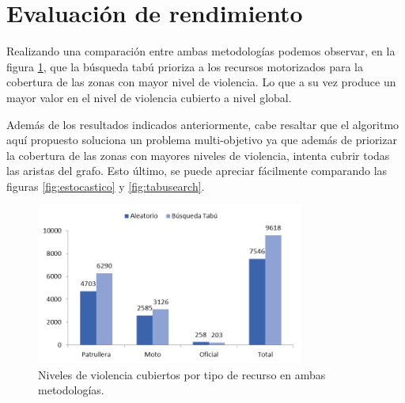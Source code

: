\section{Evaluación de rendimiento}
Realizando una comparación entre ambas metodologías podemos observar, en la figura \ref{fig:comparativa}, que la búsqueda tabú prioriza a los recursos motorizados para la cobertura de las zonas con mayor nivel de violencia. Lo que a su vez produce un mayor valor en el nivel de violencia cubierto a nivel global.

Además de los resultados indicados anteriormente, cabe resaltar que el algoritmo aquí propuesto soluciona un problema multi-objetivo ya que además de priorizar la cobertura de las zonas con mayores niveles de violencia, intenta cubrir todas las aristas del grafo. Esto último, se puede apreciar fácilmente comparando las figuras \ref{fig:estocastico} y \ref{fig:tabusearch}.
\begin{figure}
    \centering
    \includegraphics[width=88mm,scale=0.5]{images/comparativa.png}
    \caption{Niveles de violencia cubiertos por tipo de recurso en ambas metodologías.}
    \label{fig:comparativa}
\end{figure}